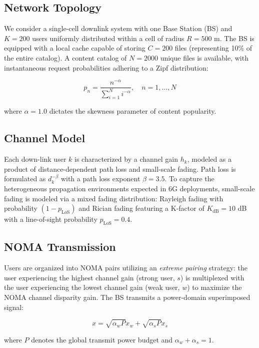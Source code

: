 \documentclass[conference]{IEEEtran}
\begin{document}
\subsection{Network Topology}
We consider a single-cell downlink system with one Base Station (BS) and $K = 200$ users uniformly distributed within a cell of radius $R = 500$ m. The BS is equipped with a local cache capable of storing $C = 200$ files (representing 10\% of the entire catalog). A content catalog of $N = 2000$ unique files is available, with instantaneous request probabilities adhering to a Zipf distribution:

\begin{equation}
p_n = \frac{n^{-\alpha}}{\sum_{i=1}^{N} i^{-\alpha}}, \quad n = 1, \ldots, N
\label{eq:zipf}
\end{equation}

where $\alpha = 1.0$ dictates the skewness parameter of content popularity.

\subsection{Channel Model}
Each down-link user $k$ is characterized by a channel gain $h_k$, modeled as a product of distance-dependent path loss and small-scale fading. Path loss is formulated as $d_k^{-\beta}$ with a path loss exponent $\beta = 3.5$. To capture the heterogeneous propagation environments expected in 6G deployments, small-scale fading is modeled via a mixed fading distribution: Rayleigh fading with probability $(1 - p_{\text{LoS}})$ and Rician fading featuring a K-factor of $K_{\text{dB}} = 10$ dB with a line-of-sight probability $p_{\text{LoS}} = 0.4$.

\subsection{NOMA Transmission}
Users are organized into NOMA pairs utilizing an \textit{extreme pairing} strategy: the user experiencing the highest channel gain (strong user, $s$) is multiplexed with the user experiencing the lowest channel gain (weak user, $w$) to maximize the NOMA channel disparity gain. The BS transmits a power-domain superimposed signal:

\begin{equation}
x = \sqrt{\alpha_w P} x_w + \sqrt{\alpha_s P} x_s
\label{eq:noma_tx}
\end{equation}

where $P$ denotes the global transmit power budget and $\alpha_w + \alpha_s = 1$.
\end{document}

